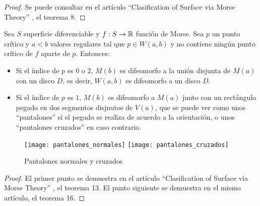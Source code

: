 \begin{proof}
	Se puede consultar en el artículo ``Clasification of Surface via Morse Theory'' \cite{MorseTh1}, el teorema 8.
\end{proof}

\begin{teorema}
	Sea $S$ superficie diferenciable y $f: S \rightarrow \mathbb{R}$ función de Morse. Sea $p$ un punto crítico y $a < b$ valores regulares tal que $p \in W(a,b)$ y no contiene ningún punto crítico de $f$ aparte de $p$. Entonces:
	\begin{itemize}
		\item Si el índice de $p$ es $0$ o $2$, $M(b)$ es difeomorfo a la unión disjunta de $M(a)$ con un disco $D$, es decir, $W(a,b)$ es difeomorfo a un disco $D$.
		\item Si el índice de $p$ es $1$, $M(b)$ es difeomorfo a $M(a)$ junto con un rectángulo pegado  en dos segmentos disjnutos de $V(a)$, que se puede ver como unos ``pantalones'' si el pegado se realiza de acuerdo a la orientación, o unos ``pantalones cruzados'' en caso contrario.
	\end{itemize}
\end{teorema}

\begin{figure}[h]
  	\centering
  	\texttt{[image: pantalones\_normales]}
  	\texttt{[image: pantalones\_cruzados]}
  	\caption{Pantalones normales y cruzados}
  	\label{fig:pantalones}
\end{figure}

\begin{proof}
	El primer punto se demuestra en el artículo ``Clasification of Surface via Morse Theory'' \cite{MorseTh1}, el teorema 13. El punto siguiente se demuestra en el mismo artículo, el teorema 16.
\end{proof}

\endinput

